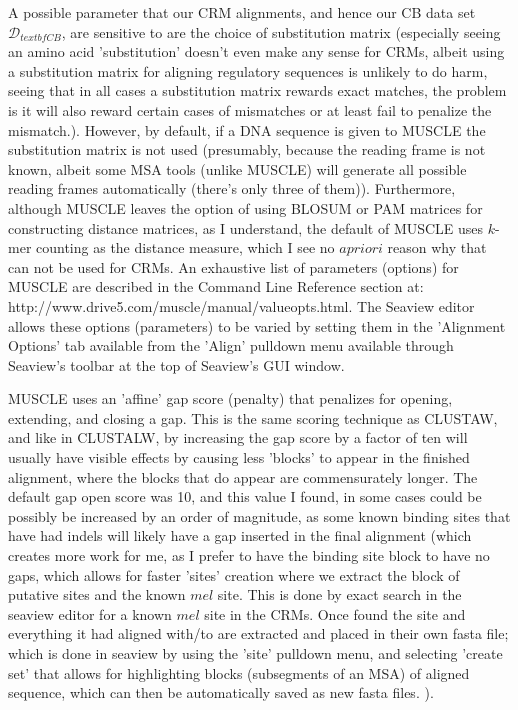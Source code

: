 A possible parameter that our CRM alignments, and hence our CB data set $\mathcal D_{textbf{CB}}$, are sensitive to are the choice of substitution matrix (especially seeing an amino acid 'substitution' doesn't even make any sense for CRMs, albeit using a substitution matrix for aligning regulatory sequences is unlikely to do harm, seeing that in all cases a substitution matrix rewards exact matches, the problem is it will also reward certain cases of mismatches or at least fail to penalize the mismatch.).  However, by default, if a DNA sequence is given to MUSCLE the substitution matrix is not used (presumably, because the reading frame is not known, albeit some MSA tools (unlike MUSCLE) will generate all possible reading frames automatically (there's only three of them)).  Furthermore, although MUSCLE leaves the option of using BLOSUM or PAM matrices for constructing distance matrices, as I understand, the default of MUSCLE uses $k$-mer counting as the distance measure, which I see no $a priori$ reason why that can not be used for CRMs.  An exhaustive list of parameters (options) for MUSCLE are described in the Command Line Reference section at:  http://www.drive5.com/muscle/manual/valueopts.html.   The Seaview editor allows these options (parameters) to be varied by setting them in the 'Alignment Options' tab available from the 'Align' pulldown menu available through Seaview's toolbar at the top of Seaview's GUI window.

MUSCLE uses an 'affine' gap score (penalty) that penalizes for opening, extending, and closing a gap.  This is the same scoring technique as CLUSTAW, and like in CLUSTALW, by increasing the gap score by a factor of ten will usually have visible effects by causing less 'blocks' to appear in the finished alignment, where the blocks that do appear are commensurately longer.  The default gap open score was 10, and this value I found, in some cases could be possibly be increased by an order of magnitude, as some known binding sites that have had indels will likely have a gap inserted in the final alignment (which creates more work for me, as I prefer to have the binding site block to have no gaps, which allows for faster 'sites' creation where we extract the block of putative sites and the known $mel$ site.  This is done by exact search in the seaview editor for a known $mel$ site in the CRMs.  Once found the site and everything it had aligned with/to are extracted and placed in their own fasta file; which is done in seaview by using the 'site' pulldown menu, and selecting 'create set' that allows for highlighting blocks (subsegments of an MSA) of aligned sequence, which can then be automatically saved as new fasta files. ).

